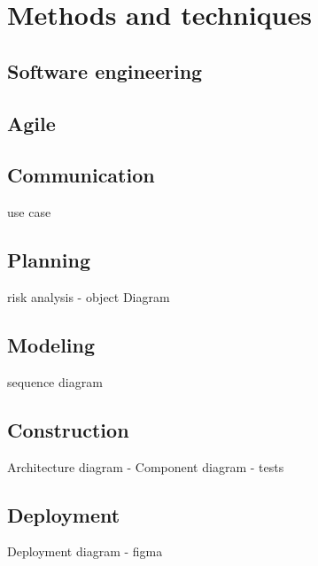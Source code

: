 \chapter{Methods and techniques}
\section{Software engineering}
\section{Agile}
\section{Communication}
use case
\section{Planning}
risk analysis - object Diagram
\section{Modeling}
sequence diagram
\section{Construction}
Architecture diagram - Component diagram - tests
\section{Deployment}
Deployment diagram - figma